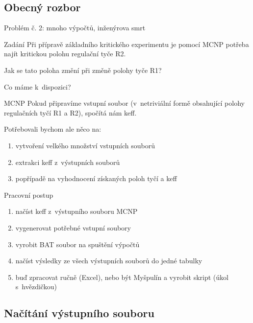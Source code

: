 \documentclass{beamer}
\begin{document}
\subsection{Obecný rozbor}

\begin{frame}{Problém č. 2: mnoho výpočtů, inženýrova smrt}
  \begin{block}{Zadání}
    Při přípravě základního kritického experimentu je pomocí MCNP potřeba najít kritickou polohu regulační tyče R2.

    Jak se tato poloha změní při změně polohy tyče R1?
  \end{block}
\end{frame}

\begin{frame}{Co máme k~dispozici?}
  \begin{block}{MCNP}
    Pokud připravíme vstupní soubor (v~netriviální formě obsahující polohy regulačních tyčí R1 a R2), spočítá nám keff.
  \end{block}
  Potřebovali bychom ale něco na:
  \begin{enumerate}
    \item vytvoření velkého množství vstupních souborů
    \item extrakci keff z~výstupních souborů
    \item popřípadě na vyhodnocení získaných poloh tyčí a keff
  \end{enumerate}
\end{frame}

\begin{frame}{Pracovní postup}
  \begin{enumerate}
    \item načíst keff z~výstupního souboru MCNP
    \pause
    \item vygenerovat potřebné vstupní soubory
    \pause
    \item vyrobit BAT soubor na spuštění výpočtů
    \pause
    \item načíst výsledky ze všech výstupních souborů do jedné tabulky
    \pause
    \item buď zpracovat ručně (Excel), nebo být Myšpulín a vyrobit skript (úkol s~hvězdičkou)
  \end{enumerate}
\end{frame}

\subsection{Načítání výstupního souboru}
\end{document}
